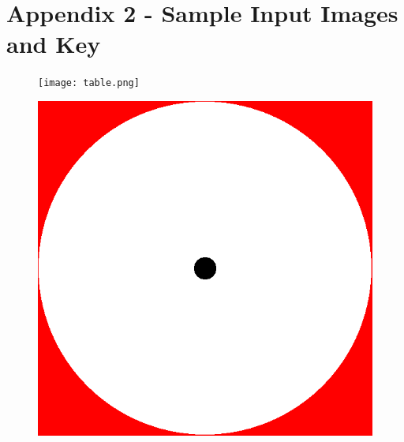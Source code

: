 \documentclass{article}
\begin{document}
\section{Appendix 2 - Sample Input Images and Key}
\newline
\newline
\newline
\begin{figure}[H]
\centering
\begin{minipage}{.5\textwidth}
  \centering
  \texttt{[image: table.png]}
  \label{fig:key}
\end{minipage}%
\begin{minipage}{.5\textwidth}
  \centering
  \includegraphics[width=.6\linewidth]{../prob0HR.png}
  \label{fig:0}
\end{minipage}
\end{figure}
\end{document}
